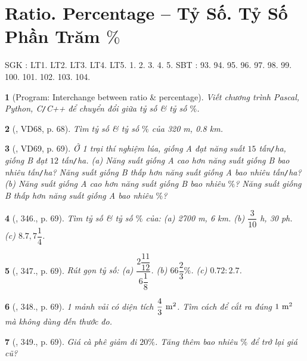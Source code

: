 \documentclass{article}
\newtheorem{baitoan}{}
\begin{document}

\section{Ratio. Percentage -- Tỷ Số. Tỷ Số Phần Trăm $\%$}
SGK \cite[Chap. V, \S9, pp. 61--66]{SGK_Toan_6_Canh_Dieu_tap_2}: LT1. LT2. LT3. LT4. LT5. 1. 2. 3. 4. 5. SBT \cite[Chap. V, \S9, pp. 54--56]{SBT_Toan_6_Canh_Dieu_tap_2}: 93. 94. 95. 96. 97. 98. 99. 100. 101. 102. 103. 104.

\begin{baitoan}[{\sf Program}: Interchange between ratio \& percentage]
	Viết chương trình {\sf Pascal, Python, C{\tt/}C++} để chuyển đổi giữa tỷ số \& tỷ số $\%$.
\end{baitoan}

\begin{baitoan}[\cite{Tuyen_Toan_6}, VD68, p. 68]
	Tìm tỷ số \& tỷ số $\%$ của {\rm320 m, 0.8 km}.
\end{baitoan}

\begin{baitoan}[\cite{Tuyen_Toan_6}, VD69, p. 69]
	Ở 1 trại thí nghiệm lúa, giống A đạt năng suất $15$ tấn{\tt/}ha, giống B đạt $12$ tấn{\tt/}ha. (a) Năng suất giống A cao hơn năng suất giống B bao nhiêu tấn{\tt/}ha? Năng suất giống B thấp hơn năng suất giống A bao nhiêu tấn{\tt/}ha? (b) Năng suất giống A cao hơn năng suất giống B bao nhiêu $\%$? Năng suất giống B thấp hơn năng suất giống A bao nhiêu $\%$? 
\end{baitoan}

\begin{baitoan}[\cite{Tuyen_Toan_6}, 346., p. 69]
	Tìm tỷ số \& tỷ số $\%$ của: (a) {\rm2700 m, 6 km}. (b) {\rm $\dfrac{3}{10}$ h, 30 ph}. (c) $8.7,7\dfrac{1}{4}$.
\end{baitoan}

\begin{baitoan}[\cite{Tuyen_Toan_6}, 347., p. 69]
	Rút gọn tỷ số: (a) $\dfrac{2\dfrac{11}{12}}{6\dfrac{1}{8}}$. (b) $66\dfrac{2}{3}\%$. (c) $0.72:2.7$.
\end{baitoan}

\begin{baitoan}[\cite{Tuyen_Toan_6}, 348., p. 69]
	1 mảnh vải có diện tích $\rm\dfrac{4}{3}\ m^2$. Tìm cách để cắt ra đúng $\rm1\ m^2$ mà không dùng đến thước đo.
\end{baitoan}

\begin{baitoan}[\cite{Tuyen_Toan_6}, 349., p. 69]
	Giá cà phê giảm đi $20\%$. Tăng thêm bao nhiêu $\%$ để trở lại giá cũ?
\end{baitoan}
\end{document}
